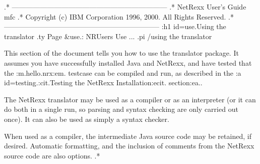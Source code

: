 .* ------------------------------------------------------------------
.* NetRexx User's Guide                                              mfc
.* Copyright (c) IBM Corporation 1996, 2000.  All Rights Reserved.
.* ------------------------------------------------------------------
:h1 id=use.Using the translator
.ty Page &use.: NRUsers Use ...
.pi /using the translator

This section of the document tells you how to use the
translator package.  It assumes you have successfully installed Java and
NetRexx, and have tested that the :m.hello.nrx:em. testcase can be
compiled and run, as described in the :a id=testing.:cit.Testing the
NetRexx Installation:ecit. section:ea..

The NetRexx translator may be used as a compiler or as an interpreter
(or it can do both in a single run, so parsing and syntax checking are
only carried out once).  It can also be used as simply a syntax checker.

When used as a compiler, the intermediate Java source code may be
retained, if desired.  Automatic formatting, and the inclusion of comments
from the NetRexx source code are also options.
.*
